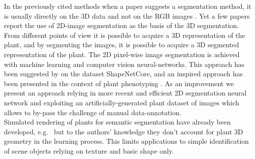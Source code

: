 {In the previously cited methods when a paper suggests a segmentation method, it is usually directly on the 3D data and not on the RGB images \cite{santos_automatic_nodate-1}. Yet a few papers report the use of 2D-image segmentation as the basis of the 3D segmentation. From different points of view it is possible to acquire a 3D representation of the plant, and by segmenting the images, it is possible to acquire a 3D segmented representation of the plant. The 2D pixel-wise image segmentation is achieved with machine learning and computer vision neural-networks. This approach has been suggested by \cite{kalogerakis_3d_2017} on the dataset ShapeNetCore, and an inspired approach has been presented in the context of plant phenotyping \cite{shi_plant-part_2019}. As an improvement we present an approach relying in more recent and efficient 2D segmentation neural network and exploiting an artificially-generated plant dataset of images which allows to by-pass the challenge of manual data-annotation.\\
 Simulated rendering of plants for semantic segmentation have already been developed, e.g.~\cite{duboudin_toward_2019, ward_deep_2018} but to the authors' knowledge they don't account for plant 3D geometry in the learning process. This limits applications to simple identification of scene objects relying on texture and basic shape only. }{}


